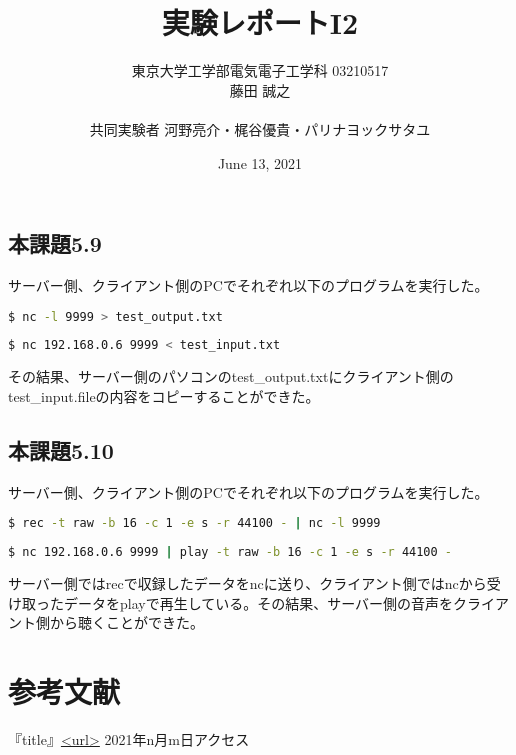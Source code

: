 \documentclass{ltjsarticle}
\title{実験レポートI2}
\author{東京大学工学部電気電子工学科 03210517\\藤田 誠之\\~\\ 共同実験者  河野亮介・梶谷優貴・パリナヨックサタユ}
\date{June 13, 2021}
\begin{document}
\maketitle

\subsection*{本課題5.9}

サーバー側、クライアント側のPCでそれぞれ以下のプログラムを実行した。
\begin{lstlisting}[caption=サーバー側,language=bash]
$ nc -l 9999 > test_output.txt
\end{lstlisting}
\begin{lstlisting}[caption=クライアント側,language=bash]
$ nc 192.168.0.6 9999 < test_input.txt
\end{lstlisting}
その結果、サーバー側のパソコンのtest\_output.txtにクライアント側のtest\_input.fileの内容をコピーすることができた。


\subsection*{本課題5.10}
サーバー側、クライアント側のPCでそれぞれ以下のプログラムを実行した。
\begin{lstlisting}[caption=サーバー側,language=bash]
$ rec -t raw -b 16 -c 1 -e s -r 44100 - | nc -l 9999
\end{lstlisting}
\begin{lstlisting}[caption=クライアント側,language=bash]
$ nc 192.168.0.6 9999 | play -t raw -b 16 -c 1 -e s -r 44100 -
\end{lstlisting}
サーバー側ではrecで収録したデータをncに送り、クライアント側ではncから受け取ったデータをplayで再生している。その結果、サーバー側の音声をクライアント側から聴くことができた。




\section{参考文献}
『title』\url{<url>} 2021年n月m日アクセス
\end{document}
